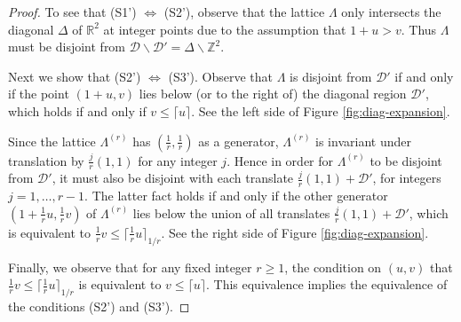 \documentclass[11pt, letterpaper, reqno]{amsart}
\theoremstyle{definition}
\theoremstyle{remark}
\numberwithin{equation}{section}
\newcommand{\RR}{\ensuremath{\mathbb{R}}}
\newcommand{\ZZ}{\ensuremath{\mathbb{Z}}}
\newcommand{\ceil}[1]{\lceil{#1}\rceil}
\newcommand{\cD}{\mathcal{D}}
\newcommand{\cDprime}{{\mathcal{D}'}}
\newcommand{\muu}{u}
\newcommand{\nuu}{v}
\begin{document}
\begin{proof}
To see that (S1') $\Leftrightarrow$ (S2'), observe that the lattice $\Lambda$ 
only intersects the  diagonal $\Delta$ of $\RR^2$
at integer points due to the assumption that $1+u >v$.
Thus $\Lambda$ must be disjoint from 
$\cD \smallsetminus \cDprime = \Delta \smallsetminus \ZZ^2$.

Next we show that (S2') $\Leftrightarrow$ (S3').
Observe that $\Lambda$ is disjoint from $ \cDprime$ if and only if 
the point $(1+\muu, \nuu)$ lies below (or to the right of) 
the diagonal region $\cDprime$, 
which holds if and only if $\nuu \leq  \ceil{\muu}$.  
See the left side of Figure \ref{fig:diag-expansion}.

Since the lattice $\Lambda^{(r)}$ has $(\frac{1}{r}, \frac{1}{r})$ as a generator, 
$\Lambda^{(r)}$ is invariant under translation by $\frac{j}{r}(1,1)$ for any integer $j$.
Hence in order for $\Lambda^{(r)}$ to be disjoint from $\cDprime$, 
it must also be disjoint with each translate $\frac{j}{r}(1,1) + \cDprime$, for integers $j=1,\ldots, r-1$.
The latter fact holds if and only if the other generator $(1+\frac{1}{r}\muu , \frac1{r}\nuu )$ 
of $\Lambda^{(r)}$ lies below the union of all translates $\frac{j}{r}(1,1) + \cDprime$,
which is equivalent to $\frac1{r}\nuu \leq \ceil{ \frac1{r}\muu }_{1/r}$.
See the right side of Figure \ref{fig:diag-expansion}.

Finally, we observe that for any fixed integer $r \ge 1$, the condition 
on $(\muu, \nuu)$ that
$\frac{1}{r}\nuu \leq \ceil{ \frac1{r}\muu }_{1/r}$ 
is equivalent to $\nuu \leq \ceil{\muu}$. 
This equivalence implies the equivalence of the conditions (S2') and (S3').
\end{proof}
\end{document}
